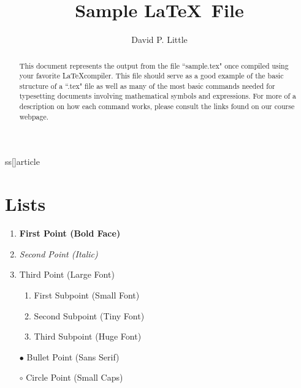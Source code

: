 ss[]{article}

\usepackage{amssymb,latexsym,amsmath}     %


\addtolength{\textwidth}{1.0in}
\addtolength{\textheight}{1.00in}
\addtolength{\evensidemargin}{-0.75in}
\addtolength{\oddsidemargin}{-0.75in}
\addtolength{\topmargin}{-.50in}


\newtheorem{theorem}{Theorem}
\newenvironment{proof}{\noindent{\bf Proof:}}{$\hfill \Box$ \vspace{10pt}}  




\title{Sample \LaTeX ~File}
\author{David P. Little}
\maketitle

\begin{abstract}
This document represents the output from the file ``sample.tex" once compiled using your favorite \LaTeX compiler.  This file should serve as a good example of the basic structure of a ``.tex" file as well as many of the most basic commands needed for typesetting documents involving mathematical symbols and expressions.  For more of a description on how each command works, please consult the links found on our course webpage.
\end{abstract}


\section{Lists}
\begin{enumerate}
\item {\bf First Point (Bold Face)}
\item {\em Second Point (Italic)}
\item {\Large Third Point (Large Font)}
    \begin{enumerate}
        \item {\small First Subpoint (Small Font)} 
        \item {\tiny Second Subpoint (Tiny Font)} 
        \item {\Huge Third Subpoint (Huge Font)} 
    \end{enumerate}
\item[$\bullet$] {\sf Bullet Point (Sans Serif)}
\item[$\circ$] {\sc Circle Point (Small Caps)} 
\end{enumerate}


